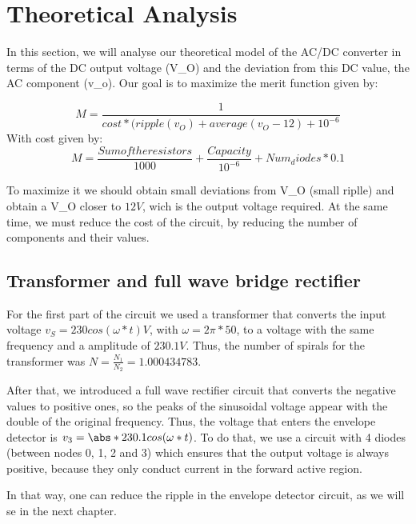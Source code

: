 \section{Theoretical Analysis}
\label{sec:analysis}

\par In this section, we will analyse our theoretical model of the AC/DC converter in terms of the DC output voltage (V_O) and the deviation from this DC value, the AC component (v_o). Our goal is to maximize the merit function given by:

\begin{equation}
M=\frac{1}{cost*(ripple(v_O)+average(v_O-12)+10^{-6}}
  \label{eq:merit}
\end{equation}
With cost given by:
\begin{equation}
M=\frac{Sum of the resistors}{1000}+\frac{Capacity}{10^{-6}}+Num_diodes*0.1
  \label{eq:cost}
\end{equation}
 
\par To maximize it we should obtain small deviations from V_O (small riplle) and obtain a V_O closer to $12V$, wich is the output voltage required. At the same time, we must reduce the cost of the circuit, by reducing the number of components and their values. 
 
\subsection{Transformer and full wave bridge rectifier}
\label{subsec:full_wave_rectifier}

\par For the first part of the circuit we used a transformer that converts the input voltage $v_S=230cos(\omega*t) V$, with $\omega=2\pi*50$, to a voltage with the same frequency and a amplitude of $230.1V$. Thus, the number of spirals for the transformer was $N=\frac{N_1}{N_2}=1.000434783$.

\par After that, we introduced a full wave rectifier circuit that converts the negative values to positive ones, so the peaks of the sinusoidal voltage appear with the double of the original frequency. Thus, the voltage that enters the envelope detector is $v_3=\abs*{230.1cos(\omega*t)}$. To do that, we use a circuit with 4 diodes (between nodes 0, 1, 2 and 3) which ensures that the output voltage is always positive, because they only conduct current in the forward active region.
\par In that way, one can reduce the ripple in the envelope detector circuit, as we will se in the next chapter.

